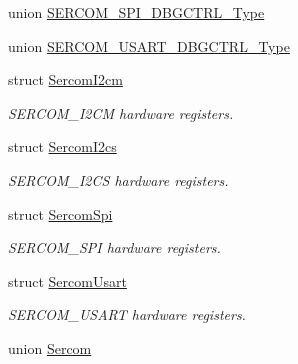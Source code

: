 \begin{DoxyCompactItemize}
\item 
union \hyperlink{union_s_e_r_c_o_m___s_p_i___d_b_g_c_t_r_l___type}{S\+E\+R\+C\+O\+M\+\_\+\+S\+P\+I\+\_\+\+D\+B\+G\+C\+T\+R\+L\+\_\+\+Type}
\item 
union \hyperlink{union_s_e_r_c_o_m___u_s_a_r_t___d_b_g_c_t_r_l___type}{S\+E\+R\+C\+O\+M\+\_\+\+U\+S\+A\+R\+T\+\_\+\+D\+B\+G\+C\+T\+R\+L\+\_\+\+Type}
\item 
struct \hyperlink{struct_sercom_i2cm}{Sercom\+I2cm}
\begin{DoxyCompactList}\small\item\em S\+E\+R\+C\+O\+M\+\_\+\+I2\+C\+M hardware registers. \end{DoxyCompactList}\item 
struct \hyperlink{struct_sercom_i2cs}{Sercom\+I2cs}
\begin{DoxyCompactList}\small\item\em S\+E\+R\+C\+O\+M\+\_\+\+I2\+C\+S hardware registers. \end{DoxyCompactList}\item 
struct \hyperlink{struct_sercom_spi}{Sercom\+Spi}
\begin{DoxyCompactList}\small\item\em S\+E\+R\+C\+O\+M\+\_\+\+S\+P\+I hardware registers. \end{DoxyCompactList}\item 
struct \hyperlink{struct_sercom_usart}{Sercom\+Usart}
\begin{DoxyCompactList}\small\item\em S\+E\+R\+C\+O\+M\+\_\+\+U\+S\+A\+R\+T hardware registers. \end{DoxyCompactList}\item 
union \hyperlink{union_sercom}{Sercom}
\end{DoxyCompactItemize}

